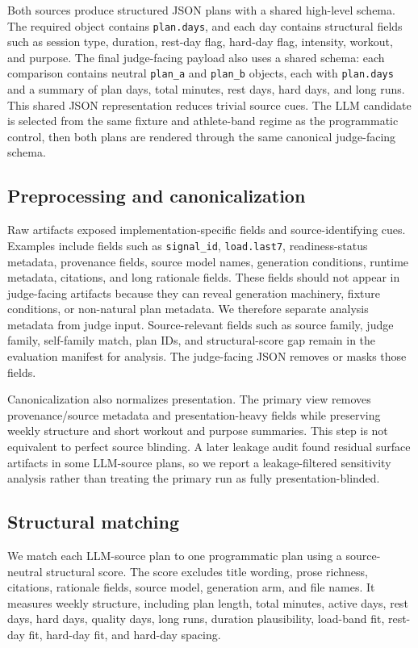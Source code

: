 \documentclass[11pt]{article}
\begin{document}
Both sources produce structured JSON plans with a shared high-level schema. The required object contains \texttt{plan.days}, and each day contains structural fields such as session type, duration, rest-day flag, hard-day flag, intensity, workout, and purpose. The final judge-facing payload also uses a shared schema: each comparison contains neutral \texttt{plan\_a} and \texttt{plan\_b} objects, each with \texttt{plan.days} and a summary of plan days, total minutes, rest days, hard days, and long runs. This shared JSON representation reduces trivial source cues. The LLM candidate is selected from the same fixture and athlete-band regime as the programmatic control, then both plans are rendered through the same canonical judge-facing schema.

\subsection{Preprocessing and canonicalization}

Raw artifacts exposed implementation-specific fields and source-identifying cues. Examples include fields such as \texttt{signal\_id}, \texttt{load.last7}, readiness-status metadata, provenance fields, source model names, generation conditions, runtime metadata, citations, and long rationale fields. These fields should not appear in judge-facing artifacts because they can reveal generation machinery, fixture conditions, or non-natural plan metadata. We therefore separate analysis metadata from judge input. Source-relevant fields such as source family, judge family, self-family match, plan IDs, and structural-score gap remain in the evaluation manifest for analysis. The judge-facing JSON removes or masks those fields.

Canonicalization also normalizes presentation. The primary view removes provenance/source metadata and presentation-heavy fields while preserving weekly structure and short workout and purpose summaries. This step is not equivalent to perfect source blinding. A later leakage audit found residual surface artifacts in some LLM-source plans, so we report a leakage-filtered sensitivity analysis rather than treating the primary run as fully presentation-blinded.

\subsection{Structural matching}

We match each LLM-source plan to one programmatic plan using a source-neutral structural score. The score excludes title wording, prose richness, citations, rationale fields, source model, generation arm, and file names. It measures weekly structure, including plan length, total minutes, active days, rest days, hard days, quality days, long runs, duration plausibility, load-band fit, rest-day fit, hard-day fit, and hard-day spacing.
\end{document}

